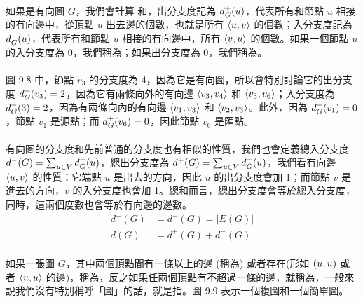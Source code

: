 \documentclass[12pt,a4paper,oneside]{report}
\begin{document}
\begin{CJK}{UTF8}{bkai}
\paragraph{}如果是有向圖 $G$，我們會計算\textbf{} 和\textbf{}，出分支度記為 $d^{+}_{G}{(u)}$，代表所有和節點 $u$ 相接的有向邊中，從頂點 $u$ 出去邊的個數，也就是所有 $\langle{}{{u},{v}}\rangle{}$ 的個數；入分支度記為 $d^{-}_{G}{(u)}$，代表所有和節點 $u$ 相接的有向邊中，所有 $\langle{}{{v},{u}}\rangle{}$ 的個數。如果一個節點 $u$ 的入分支度為 0，我們稱為\textbf{}；如果出分支度為 0，我們稱為\textbf{}。
\paragraph{}圖 9.8 中，節點 $v_3$ 的分支度為 4，因為它是有向圖，所以會特別討論它的出分支度 $d^{+}_{G}{(v_3)}=2$，因為它有兩條向外的有向邊 $\langle{}{{v_3},{v_4}}\rangle{}$ 和 $\langle{}{{v_3},{v_6}}\rangle{}$；入分支度為 $d^{-}_{G}{(3)}=2$，因為有兩條向內的有向邊 $\langle{}{{v_1},{v_3}}\rangle{}$ 和 $\langle{}{{v_2},{v_3}}\rangle{}$。此外，因為 $d^{-}_{G}{(v_1)}=0$，節點 $v_1$ 是源點；而 $d^{+}_{G}{(v_6)}=0$，因此節點 $v_6$ 是匯點。
\paragraph{}有向圖的分支度和先前普通的分支度也有相似的性質，我們也會定義總入分支度 $d^{-}{(G)}=\sum_{u\in{V}}{d^{-}_{G}{(u)}}$，總出分支度為 $d^{+}{(G)}=\sum_{u\in{V}}{d^{+}_{G}{(u)}}$，我們看有向邊 $\langle{}{{u},{v}}\rangle{}$ 的性質：它端點 $u$ 是出去的方向，因此 $u$ 的出分支度會加 1；而節點 $v$ 是進去的方向，$v$ 的入分支度也會加 1。總和而言，總出分支度會等於總入分支度，同時，這兩個度數也會等於有向邊的邊數。
\begin{align}
\label{eq-degree-directed}
d^{+}{(G)}&=d^{-}{(G)}=|E(G)|\\
d(G)&=d^{+}{(G)}+d^{-}{(G)}
\end{align}
\paragraph{}如果一張圖 $G$，其中兩個頂點間有一條以上的邊 (稱為) 或者存在\textbf{}(形如 $({u},{u})$ 或者 $\langle{}{{u},{u}}\rangle{}$ 的邊)，稱為，反之如果任兩個頂點有不超過一條的邊，就稱為\textbf{}，一般來說我們沒有特別稱呼「圖」的話，就是指。圖 9.9 表示一個複圖和一個簡單圖。


\end{CJK}
\end{document}
